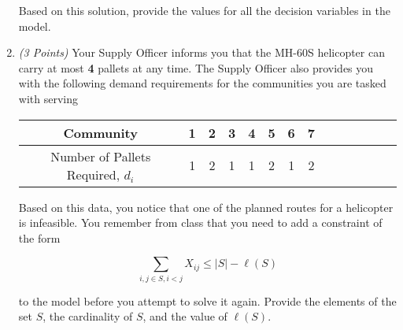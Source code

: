 \documentclass[10pt]{article}
\newcommand{\points}[1]{{\it (#1 Points)}}
\begin{document}
\begin{enumerate}
\begin{center}
\begin{tikzpicture}
        \end{tikzpicture}
\end{center}

Based on this solution, provide the values for all the decision variables in the model.


\vfill

\item \points{3} Your Supply Officer informs you that the MH-60S helicopter can carry at most {\bf 4} pallets at any time.  The Supply Officer also provides you with the following demand requirements for the communities you are tasked with serving

\begin{center}
\begin{tabular}{c|c|c|c|c|c|c|c|c|c|c|c|c|c|}
Community &  1	&	2	&	3	&	4	& 5	&	6   & 7   \\
\hline
Number of Pallets Required, $d_i$  & 1	&	2	&	1	&	1	&	2	&	1	&   2
\end{tabular}
\end{center}

\noindent Based on this data, you notice that one of the planned routes for a helicopter is infeasible.  You remember from class that you need to add a constraint of the form 

\[
  \sum_{i, j \in S, i < j} X_{ij} \leq |S| - \ell(S) 
\]

to the model before you attempt to solve it again.  Provide the elements of the set $S$, the cardinality of $S$, and the value of $\ell(S)$.
    

\vfill


\end{enumerate}
\end{document}
